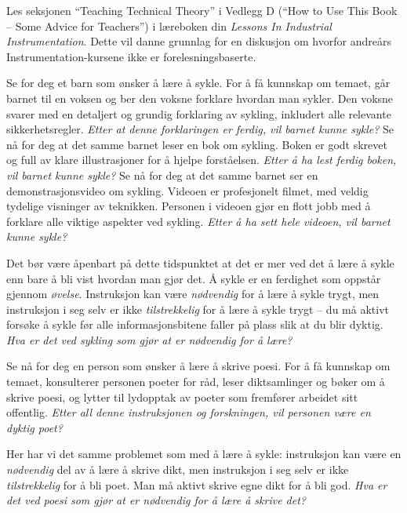 

Les seksjonen ``Teaching Technical Theory'' i Vedlegg D (``How to Use This Book -- Some Advice for Teachers'') i læreboken din {\it Lessons In Industrial Instrumentation}.  Dette vil danne grunnlag for en diskusjon om hvorfor andreårs Instrumentation-kursene ikke er forelesningsbaserte.

\vskip 10pt

Se for deg et barn som ønsker å lære å sykle.  For å få kunnskap om temaet, går barnet til en voksen og ber den voksne forklare hvordan man sykler.  Den voksne svarer med en detaljert og grundig forklaring av sykling, inkludert alle relevante sikkerhetsregler.  {\it Etter at denne forklaringen er ferdig, vil barnet kunne sykle?}  Se nå for deg at det samme barnet leser en bok om sykling.  Boken er godt skrevet og full av klare illustrasjoner for å hjelpe forståelsen.  {\it Etter å ha lest ferdig boken, vil barnet kunne sykle?}  Se nå for deg at det samme barnet ser en demonstrasjonsvideo om sykling.  Videoen er profesjonelt filmet, med veldig tydelige visninger av teknikken.  Personen i videoen gjør en flott jobb med å forklare alle viktige aspekter ved sykling.  {\it Etter å ha sett hele videoen, vil barnet kunne sykle?}

Det bør være åpenbart på dette tidspunktet at det er mer ved det å lære å sykle enn bare å bli vist hvordan man gjør det.  Å sykle er en ferdighet som oppstår gjennom {\it øvelse}.  Instruksjon kan være {\it nødvendig} for å lære å sykle trygt, men instruksjon i seg selv er ikke {\it tilstrekkelig} for å lære å sykle trygt -- du må aktivt forsøke å sykle før alle informasjonsbitene faller på plass slik at du blir dyktig.  {\it Hva er det ved sykling som gjør at  er nødvendig for å lære?}

\vskip 10pt

Se nå for deg en person som ønsker å lære å skrive poesi.  For å få kunnskap om temaet, konsulterer personen poeter for råd, leser diktsamlinger og bøker om å skrive poesi, og lytter til lydopptak av poeter som fremfører arbeidet sitt offentlig.  {\it Etter all denne instruksjonen og forskningen, vil personen være en dyktig poet?}

Her har vi det samme problemet som med å lære å sykle: instruksjon kan være en {\it nødvendig} del av å lære å skrive dikt, men instruksjon i seg selv er ikke {\it tilstrekkelig} for å bli poet.  Man må aktivt skrive egne dikt for å bli god.  {\it Hva er det ved poesi som gjør at  er nødvendig for å lære å skrive det?}

